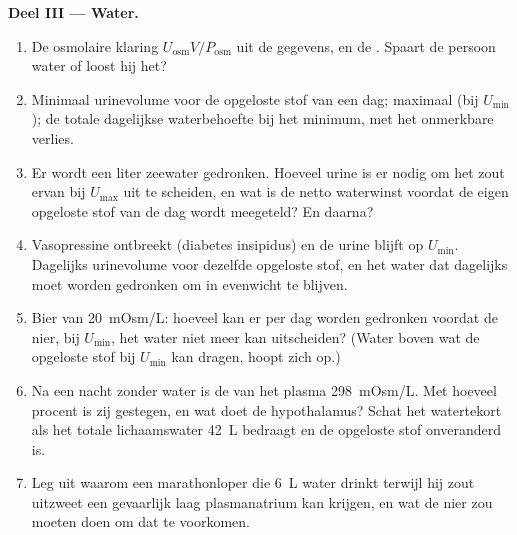 \begin{problem}
\medskip
\noindent\textbf{Deel III --- Water.}
\begin{enumerate}[resume]
  \item De osmolaire klaring $U_{\text{osm}}V/P_{\text{osm}}$ uit de
        gegevens, en de . Spaart de persoon water of
        loost hij het?
  \item Minimaal urinevolume voor de opgeloste stof van een dag;
        maximaal (bij $U_{\min}$); de totale dagelijkse waterbehoefte
        bij het minimum, met het onmerkbare verlies.
  \item Er wordt een liter zeewater gedronken. Hoeveel urine is er
        nodig om het zout ervan bij $U_{\max}$ uit te scheiden, en wat
        is de netto waterwinst voordat de eigen opgeloste stof van de
        dag wordt meegeteld? En daarna?
  \item Vasopressine ontbreekt (diabetes insipidus) en de urine blijft
        op $U_{\min}$. Dagelijks urinevolume voor dezelfde opgeloste
        stof, en het water dat dagelijks moet worden gedronken om in
        evenwicht te blijven.
  \item Bier van \qty{20}{mOsm/L}: hoeveel kan er per dag worden
        gedronken voordat de nier, bij $U_{\min}$, het water niet meer
        kan uitscheiden? (Water boven wat de opgeloste stof bij
        $U_{\min}$ kan dragen, hoopt zich op.)
  \item Na een nacht zonder water is de  van het plasma
        \qty{298}{mOsm/L}. Met hoeveel procent is zij gestegen, en wat
        doet de hypothalamus? Schat het watertekort als het totale
        lichaamswater \qty{42}{L} bedraagt en de opgeloste stof
        onveranderd is.
  \item Leg uit waarom een marathonloper die \qty{6}{L} water drinkt
        terwijl hij zout uitzweet een gevaarlijk laag plasmanatrium kan
        krijgen, en wat de nier zou moeten doen om dat te voorkomen.
\end{enumerate}


\end{problem}
